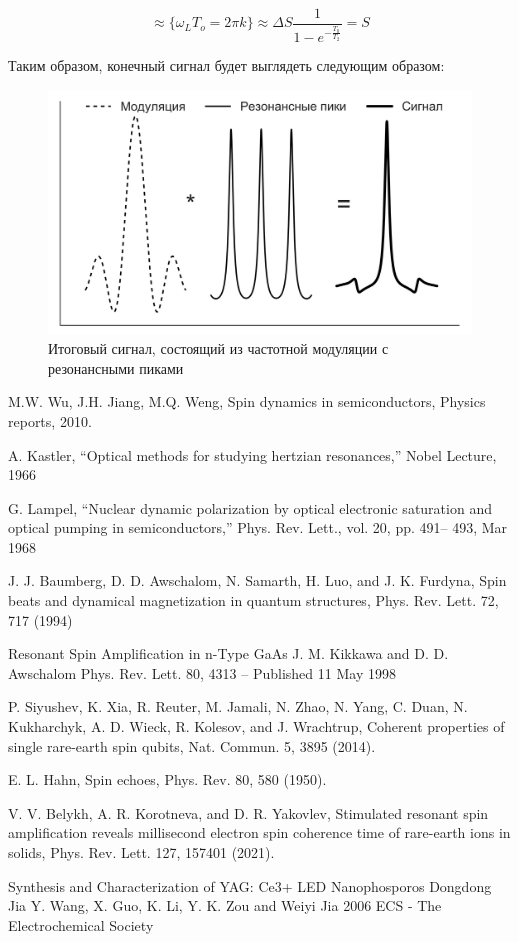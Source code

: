 \documentclass[a4paper,12pt]{article}
\begin{document}
$$
\approx \{ \omega_L T_o = 2 \pi k\} \approx \Delta S \frac{1}{1 - e^{-\frac{T_0}{T_2}}} = S
$$

Таким образом, конечный сигнал будет выглядеть следующим образом:

\begin{figure}
	\includegraphics[scale = 0.35]{modulation_graph.png}
	\caption{Итоговый сигнал, состоящий из частотной модуляции с резонансными пиками}
	\label{fig:modulation_graph}
\end{figure}


\begin{thebibliography}{}
	
	M.W. Wu, J.H. Jiang, M.Q. Weng,
	Spin dynamics in semiconductors, Physics reports, 2010.
	
	A. Kastler, “Optical methods for studying hertzian resonances,” Nobel
	Lecture, 1966
	
	G. Lampel, “Nuclear dynamic polarization by optical electronic saturation
	and optical pumping in semiconductors,” Phys. Rev. Lett., vol. 20, pp. 491–
	493, Mar 1968
	
	J. J. Baumberg, D. D. Awschalom, N. Samarth, H. Luo, and J. K. Furdyna, Spin beats and dynamical magnetization in quantum structures, Phys. Rev. Lett. 72, 717 (1994)
	
	Resonant Spin Amplification in 
	n-Type GaAs
	J. M. Kikkawa and D. D. Awschalom
	Phys. Rev. Lett. 80, 4313 – Published 11 May 1998
	
	P. Siyushev, K. Xia, R. Reuter, M. Jamali, N. Zhao,
	N. Yang, C. Duan, N. Kukharchyk, A. D. Wieck,
	R. Kolesov, and J. Wrachtrup, Coherent properties of single rare-earth spin qubits, Nat. Commun. 5, 3895 (2014).
	
	E. L. Hahn, Spin echoes, Phys. Rev. 80, 580 (1950).
	
	V. V. Belykh, A. R. Korotneva, and D. R. Yakovlev,
	Stimulated resonant spin amplification reveals millisecond electron spin coherence time of rare-earth ions in
	solids, Phys. Rev. Lett. 127, 157401 (2021).
	
	Synthesis and Characterization of YAG: Ce3+ LED Nanophosporos
	Dongdong Jia Y. Wang, X. Guo, K. Li, Y. K. Zou and Weiyi Jia 
	2006 ECS - The Electrochemical Society

\end{thebibliography}
\end{document}
